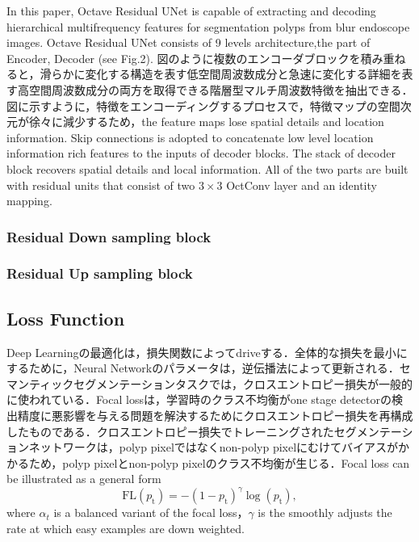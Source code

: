 \documentclass{article}
\begin{document}
In this paper, Octave Residual UNet is capable of extracting and decoding hierarchical multifrequency features for  segmentation polyps from blur endoscope images. Octave Residual UNet consists of 9 levels architecture,the part of Encoder, Decoder (see Fig.2).
図のように複数のエンコーダブロックを積み重ねると，滑らかに変化する構造を表す低空間周波数成分と急速に変化する詳細を表す高空間周波数成分の両方を取得できる階層型マルチ周波数特徴を抽出できる．図に示すように，特徴をエンコーディングするプロセスで，特徴マップの空間次元が徐々に減少するため，the feature maps lose spatial details and location information. Skip connections  is adopted to concatenate low level location information rich features to the inputs of decoder blocks. The stack of decoder block recovers spatial details and local information. All of the two parts are built with residual units that consist of two $3\times3$ OctConv layer and an identity mapping.

\subsubsection{Residual Down sampling block }

\subsubsection{Residual Up sampling block }

\subsection{Loss Function}
Deep Learningの最適化は，損失関数によってdriveする．全体的な損失を最小にするために，Neural Networkのパラメータは，逆伝播法によって更新される．セマンティックセグメンテーションタスクでは，クロスエントロピー損失が一般的に使われている．Focal lossは，学習時のクラス不均衡がone stage detectorの検出精度に悪影響を与える問題を解決するためにクロスエントロピー損失を再構成したものである．クロスエントロピー損失でトレーニングされたセグメンテーションネットワークは，polyp pixelではなくnon-polyp pixelにむけてバイアスがかかるため，polyp pixelとnon-polyp pixelのクラス不均衡が生じる．Focal loss can be illustrated as a general form  
\begin{equation}
\mathrm{FL}\left(p_{\mathrm{t}}\right)=-\left(1-p_{\mathrm{t}}\right)^{\gamma} \log \left(p_{\mathrm{t}}\right),
\end{equation}
where $\alpha_t$ is a balanced variant of the focal loss，$\gamma$ is the smoothly adjusts the rate at which easy examples are down weighted.
\end{document}
